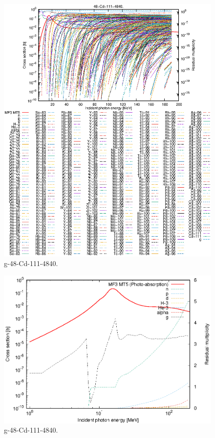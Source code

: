 \begin{figure}
 \includegraphics[width=\linewidth]{eps/g_48-Cd-111_4840.eps}
  \caption{g-48-Cd-111-4840.}
\end{figure}
\newpage \clearpage

\begin{figure}
 \includegraphics[width=\linewidth]{eps-log/g_48-Cd-111_4840.eps}
 \caption{g-48-Cd-111-4840.}
\end{figure}
\newpage \clearpage

